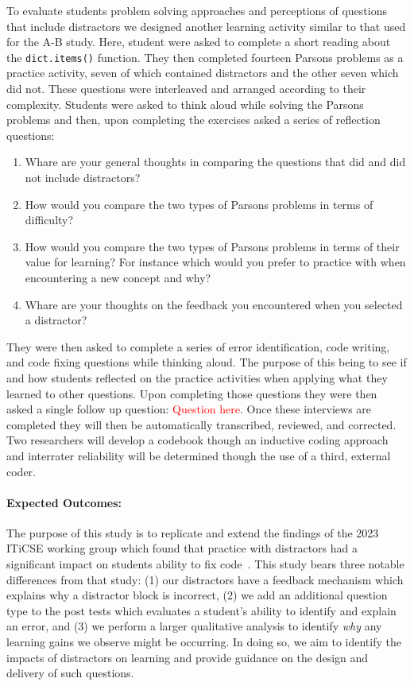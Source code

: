 \documentclass[authorversion,nonacm]{acmart}
\begin{document}
To evaluate students problem solving approaches and perceptions of questions 
that include distractors we designed another learning activity similar to that
used for the A-B study. Here, student were asked to complete a short reading about
the \texttt{dict.items()} function. They then completed fourteen Parsons problems 
as a practice activity, seven of which contained distractors and the other seven
which did not. These questions were interleaved and arranged according to their
complexity. Students were asked to think aloud while solving the Parsons
problems and then, upon completing the exercises asked a series of reflection questions:
\begin{enumerate}
  \item Whare are your general thoughts in comparing the questions that did and did not include distractors?
  \item How would you compare the two types of Parsons problems in terms of difficulty?
  \item How would you compare the two types of Parsons problems in terms of their value for learning? For instance which would you prefer to practice with when encountering a new concept and why?
  \item Whare are your thoughts on the feedback you encountered when you selected a distractor?
\end{enumerate}
They were then asked to complete a series of error identification, code
writing, and code fixing questions while thinking aloud. The purpose of this
being to see if and how students reflected on the practice activities when
applying what they learned to other questions. Upon completing those questions
they were then asked a single follow up question: \textcolor{red}{Question
here}. Once these interviews are completed they will then be automatically
transcribed, reviewed, and corrected. Two researchers will develop a codebook
though an inductive coding approach and interrater reliability will be
determined though the use of a third, external coder.

\paragraph{Expected Outcomes:} The purpose of this study is to replicate and
extend the findings of the 2023 ITiCSE working group which found that practice
with distractors had a significant impact on students ability to fix
code~\cite{ericson2023multi}. This study bears three notable differences from
that study: (1) our distractors have a feedback mechanism which explains why a
distractor block is incorrect, (2) we add an additional question type to the
post tests which evaluates a student's ability to identify and explain an
error, and (3) we perform a larger qualitative analysis to identify
\textit{why} any learning gains we observe might be occurring. In doing so, we
aim to identify the impacts of distractors on learning and provide guidance on
the design and delivery of such questions.
\end{document}
